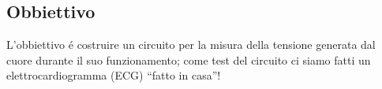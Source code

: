 \subsection{Obbiettivo}

L'obbiettivo é costruire un circuito per la misura della tensione
generata dal cuore durante il suo funzionamento; come test del circuito ci siamo fatti
un elettrocardiogramma (ECG) ``fatto in casa''!

